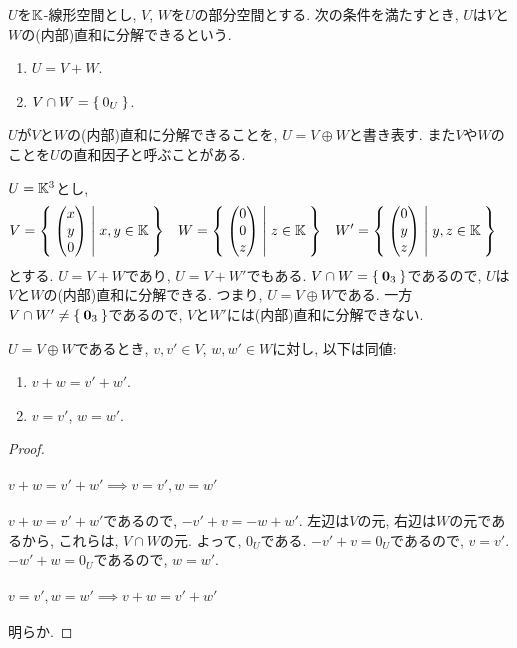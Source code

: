 \begin{definition}
  $U$を$\mathbb{K}$-線形空間とし,
  $V$, $W$を$U$の部分空間とする.
  次の条件を満たすとき,
  $U$は$V$と$W$の(内部)直和に分解できるという.
  \begin{enumerate}
  \item $U=V+W$.
  \item $V\cap W=\Set{0_U}$.
  \end{enumerate}
  $U$が$V$と$W$の(内部)直和に分解できることを,
  $U=V\oplus W$と書き表す.
  また$V$や$W$のことを$U$の直和因子と呼ぶことがある.
\end{definition}
\begin{example}
  $U=\mathbb{K}^3$とし,
  \begin{align*}
    V&=\Set{\begin{pmatrix}x\\y\\0\end{pmatrix}|x,y\in\mathbb{K}}&
    W&=\Set{\begin{pmatrix}0\\0\\z\end{pmatrix}|z\in\mathbb{K}}&
    W'&=\Set{\begin{pmatrix}0\\y\\z\end{pmatrix}|y,z\in\mathbb{K}}
  \end{align*}
  とする.
  $U=V+W$であり, $U=V+W'$でもある.
  $V\cap W=\Set{\boldsymbol{0}_3}$であるので,
  $U$は$V$と$W$の(内部)直和に分解できる.
  つまり, $U=V\oplus W$である.
  一方$V\cap W'\neq \Set{\boldsymbol{0}_3}$であるので,
  $V$と$W'$には(内部)直和に分解できない.
\end{example}

\begin{prop}
  $U=V\oplus W$であるとき,
  $v,v'\in V$,
  $w,w'\in W$に対し, 以下は同値:
  \begin{enumerate}
  \item $v\plus w=v'\plus w'$.
  \item $v=v'$, $w=w'$.
  \end{enumerate}
\end{prop}
\begin{proof}
  \paragraph{$v\plus w=v'\plus w'\implies v=v', w=w'$}
  $v\plus w=v'\plus w'$であるので,
  $-v'\plus v=-w\plus w'$.
  左辺は$V$の元, 右辺は$W$の元であるから,
  これらは, $V\cap W$の元.
  よって, $0_U$である.
  $-v'\plus v=0_U$であるので, $v=v'$.
  $-w'\plus w=0_U$であるので, $w=w'$.
  
  \paragraph{$v=v', w=w'\implies v\plus w=v'\plus w'$}
  明らか.
\end{proof}


